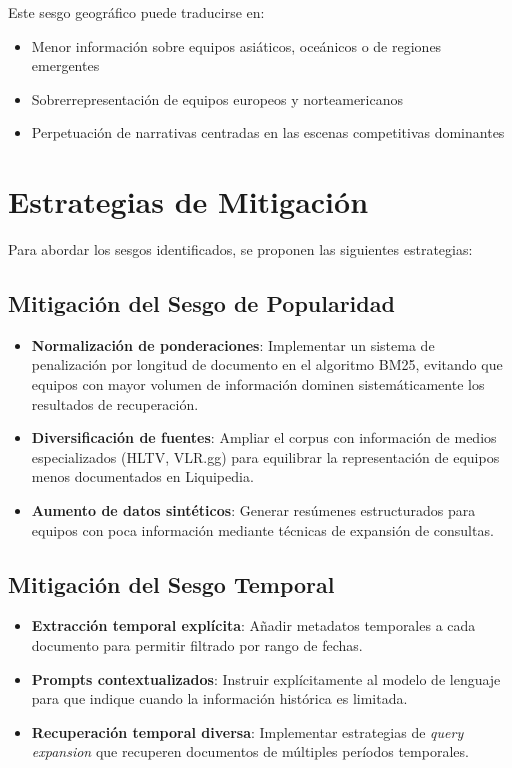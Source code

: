Este sesgo geográfico puede traducirse en:
\begin{itemize}
    \item Menor información sobre equipos asiáticos, oceánicos o de regiones emergentes
    \item Sobrerrepresentación de equipos europeos y norteamericanos
    \item Perpetuación de narrativas centradas en las escenas competitivas dominantes
\end{itemize}


\section{Estrategias de Mitigación}

Para abordar los sesgos identificados, se proponen las siguientes estrategias:

\subsection{Mitigación del Sesgo de Popularidad}

\begin{itemize}
    \item \textbf{Normalización de ponderaciones}: Implementar un sistema de penalización por longitud de documento en el algoritmo BM25, evitando que equipos con mayor volumen de información dominen sistemáticamente los resultados de recuperación.
    \item \textbf{Diversificación de fuentes}: Ampliar el corpus con información de medios especializados (HLTV, VLR.gg) para equilibrar la representación de equipos menos documentados en Liquipedia.
    \item \textbf{Aumento de datos sintéticos}: Generar resúmenes estructurados para equipos con poca información mediante técnicas de expansión de consultas.
\end{itemize}

\subsection{Mitigación del Sesgo Temporal}

\begin{itemize}
    \item \textbf{Extracción temporal explícita}: Añadir metadatos temporales a cada documento para permitir filtrado por rango de fechas.
    \item \textbf{Prompts contextualizados}: Instruir explícitamente al modelo de lenguaje para que indique cuando la información histórica es limitada.
    \item \textbf{Recuperación temporal diversa}: Implementar estrategias de \textit{query expansion} que recuperen documentos de múltiples períodos temporales.
\end{itemize}

